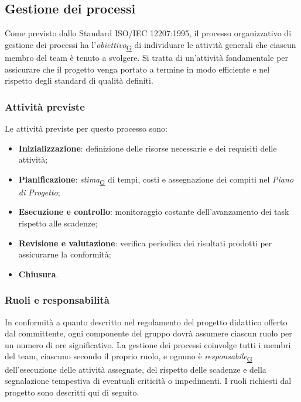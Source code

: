 \documentclass[a4paper,12pt]{article}
\begin{document}
    \subsection{Gestione dei processi}
        Come previsto dallo Standard ISO/IEC 12207:1995, il processo organizzativo di gestione dei processi ha l'\textit{obiettivo}\textsubscript{\href{https://atlasteam9.github.io/Atlas/glossario.html\#Obiettivo}{G}} di individuare le attività generali che ciascun membro del team è tenuto a svolgere. Si tratta di un'attività fondamentale per assicurare che il progetto venga portato a termine in modo efficiente e nel rispetto degli standard di qualità definiti.
        
        \subsubsection{Attività previste}
            Le attività previste per questo processo sono:
            \begin{itemize}
                \item \textbf{Inizializzazione}: definizione delle risorse necessarie e dei requisiti delle attività;
                \item \textbf{Pianificazione}: \textit{stima}\textsubscript{\href{https://atlasteam9.github.io/Atlas/glossario.html\#Stima}{G}} di tempi, costi e assegnazione dei compiti nel \textit{Piano di Progetto};
                \item \textbf{Esecuzione e controllo}: monitoraggio costante dell'avanzamento dei task rispetto alle scadenze;
                \item \textbf{Revisione e valutazione}: verifica periodica dei risultati prodotti per assicurarne la conformità;
                \item \textbf{Chiusura}.            
            \end{itemize}
            
        \subsubsection{Ruoli e responsabilità}
            In conformità a quanto descritto nel regolamento del progetto didattico offerto dal committente, ogni componente del gruppo dovrà assumere ciascun ruolo per un numero di ore significativo. La gestione dei processi coinvolge tutti i membri del team, ciascuno secondo il proprio ruolo, e ognuno è \textit{responsabile}\textsubscript{\href{https://atlasteam9.github.io/Atlas/glossario.html\#Responsabile}{G}} dell'esecuzione delle attività assegnate, del rispetto delle scadenze e della segnalazione tempestiva di eventuali criticità o impedimenti. I ruoli richiesti dal progetto sono descritti qui di seguito.
\end{document}
